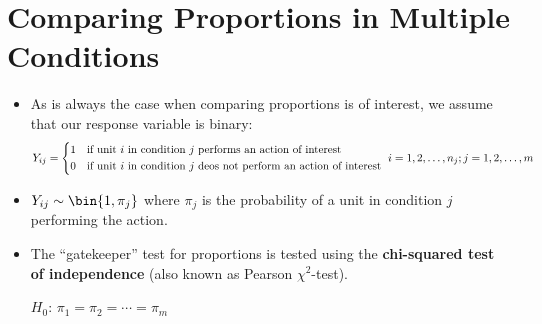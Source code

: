 \section{Comparing Proportions in Multiple Conditions}
\begin{itemize}
      \item As is always the case when comparing proportions is of interest, we assume that our response variable
            is binary:
            \[ Y_{ij}=\begin{cases*}
                        1 & if unit $ i $ in condition $ j $ performs an action of interest         \\
                        0 & if unit $ i $ in condition $ j $ deos not perform an action of interest
                  \end{cases*}i=1,2,\ldots,n_j;j=1,2,\ldots,m \]
      \item $ Y_{ij}\sim \bin{1,\pi_j} $
            where $ \pi_j $ is the probability of a unit in condition $ j $ performing the action.
      \item The ``gatekeeper'' test for proportions is tested using the \textbf{chi-squared test
                  of independence} (also known as Pearson $ \chi^2 $-test).

            \centerline{$ H_0 $: $ \pi_1=\pi_2=\cdots=\pi_m $}
\end{itemize}
